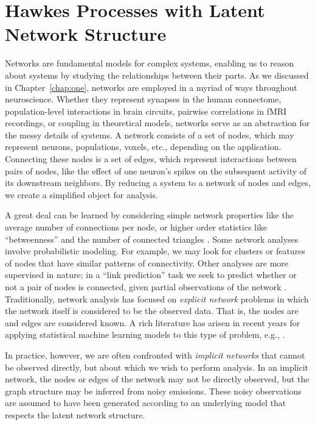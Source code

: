 
\chapter{Hawkes Processes with Latent Network Structure}
\label{chap:three}

Networks are fundamental models for complex systems, enabling us to
reason about systems by studying the relationships between their
parts.  As we discussed in Chapter~\ref{chap:one}, networks are
employed in a myriad of ways throughout neuroscience.  Whether they
represent synapses in the human connectome, population-level
interactions in brain circuits, pairwise correlations in fMRI
recordings, or coupling in theoretical models, networks serve as an
abstraction for the messy details of systems.  A network consists of a
set of nodes, which may represent neurons, populations, voxels, etc.,
depending on the application.  Connecting these nodes is a set of
edges, which represent interactions between pairs of nodes, like the
effect of one neuron's spikes on the subsequent activity of its
downstream neighbors.  By reducing a system to a network of nodes and
edges, we create a simplified object for analysis.

A great deal can be learned by considering simple network properties
like the average number of connections per node, or higher order
statistics like ``betweenness'' and the number of connected triangles
\citep{bullmore2009complex}.  Some network analyses involve
probabilistic modeling.  For example, we may look for clusters or
features of nodes that have similar patterns of connectivity.  Other
analyses are more supervised in nature; in a ``link prediction'' task
we seek to predict whether or not a pair of nodes is connected, given
partial observations of the network \citep{Liben-2007}.
Traditionally, network analysis has focused on \emph{explicit network}
problems in which the network itself is considered to be the observed
data.  That is, the nodes are and edges are considered known. A rich
literature has arisen in recent years for applying statistical machine
learning models to this type of problem, e.g.,
\citet{Liben-2007,Hoff-2008,Goldenberg-2010}.

In practice, however, we are often confronted with \emph{implicit
  networks} that cannot be observed directly, but about which we wish
to perform analysis.  In an implicit network, the nodes or edges of
the network may not be directly observed, but the graph structure may
be inferred from noisy emissions.  These noisy observations are
assumed to have been generated according to an underlying model that
respects the latent network structure.

